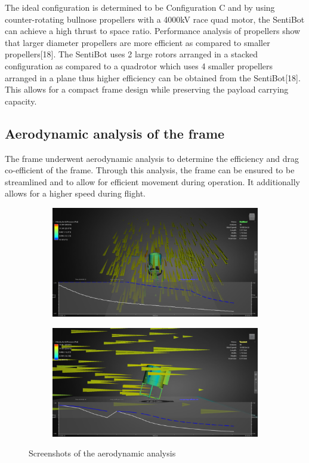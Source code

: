\documentclass[12pt]{article}
\begin{document}
The ideal configuration is determined to be Configuration C and by using counter-rotating bullnose propellers with a 4000kV race quad motor, the SentiBot can achieve a high thrust to space ratio. Performance analysis of propellers show that larger diameter propellers are more efficient as compared to smaller propellers[18]. The SentiBot uses 2 large rotors arranged in a stacked configuration as compared to a quadrotor which uses 4 smaller propellers arranged in a plane thus higher efficiency can be obtained from the SentiBot[18]. This allows for a compact frame design while preserving the payload carrying capacity.

\subsection{Aerodynamic analysis of the frame}

The frame underwent aerodynamic analysis to determine the efficiency and drag co-efficient of the frame. Through this analysis, the frame can be ensured to be streamlined and to allow for efficient movement during operation. It additionally allows for a higher speed during flight.

\begin{figure}[h]
	\centering
	\begin{subfigure}{0.5\textwidth}
		\centering
		\includegraphics[width=0.9\linewidth]{aerodynamic-1.png}
	\end{subfigure}
	\begin{subfigure}{0.5\textwidth}
		\centering
		\includegraphics[width=0.9\linewidth]{aerodynamic-2.png}
	\end{subfigure}
	\caption{Screenshots of the aerodynamic analysis}
	\label{fig:aerodynamic}
\end{figure}
\end{document}
